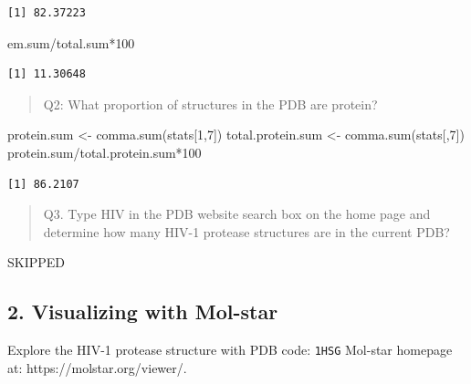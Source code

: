 \documentclass[
  letterpaper,
  DIV=11,
  numbers=noendperiod]{scrartcl}
\newenvironment{Shaded}{\begin{snugshade}}{\end{snugshade}}
\newcommand{\DecValTok}[1]{\textcolor[rgb]{0.68,0.00,0.00}{#1}}
\newcommand{\FunctionTok}[1]{\textcolor[rgb]{0.28,0.35,0.67}{#1}}
\newcommand{\NormalTok}[1]{\textcolor[rgb]{0.00,0.23,0.31}{#1}}
\newcommand{\OtherTok}[1]{\textcolor[rgb]{0.00,0.23,0.31}{#1}}
\newcommand{\SpecialCharTok}[1]{\textcolor[rgb]{0.37,0.37,0.37}{#1}}
\begin{document}
\begin{verbatim}
[1] 82.37223
\end{verbatim}

\begin{Shaded}
\begin{Highlighting}[]
\NormalTok{em.sum}\SpecialCharTok{/}\NormalTok{total.sum}\SpecialCharTok{*}\DecValTok{100}
\end{Highlighting}
\end{Shaded}

\begin{verbatim}
[1] 11.30648
\end{verbatim}

\begin{quote}
Q2: What proportion of structures in the PDB are protein?
\end{quote}

\begin{Shaded}
\begin{Highlighting}[]
\NormalTok{protein.sum }\OtherTok{\textless{}{-}} \FunctionTok{comma.sum}\NormalTok{(stats[}\DecValTok{1}\NormalTok{,}\DecValTok{7}\NormalTok{])}
\NormalTok{total.protein.sum }\OtherTok{\textless{}{-}} \FunctionTok{comma.sum}\NormalTok{(stats[,}\DecValTok{7}\NormalTok{])}
\NormalTok{protein.sum}\SpecialCharTok{/}\NormalTok{total.protein.sum}\SpecialCharTok{*}\DecValTok{100}
\end{Highlighting}
\end{Shaded}

\begin{verbatim}
[1] 86.2107
\end{verbatim}

\begin{quote}
Q3. Type HIV in the PDB website search box on the home page and
determine how many HIV-1 protease structures are in the current PDB?
\end{quote}

SKIPPED

\subsection{2. Visualizing with
Mol-star}\label{visualizing-with-mol-star}

Explore the HIV-1 protease structure with PDB code: \texttt{1HSG}
Mol-star homepage at: https://molstar.org/viewer/.
\end{document}
